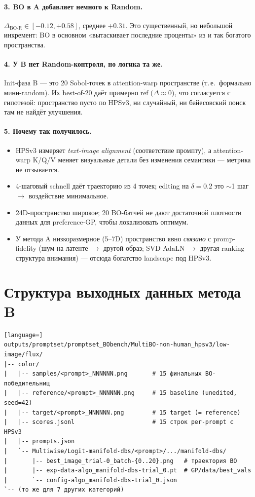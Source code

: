 \documentclass[11pt,a4paper]{article}
\begin{document}
\paragraph{3. BO в A добавляет немного к Random.}
$\Delta_\text{BO-R} \in [-0.12, +0.58]$, среднее $+0.31$. Это
существенный, но небольшой инкремент: BO в основном «вытаскивает
последние проценты» из и так богатого пространства.

\paragraph{4. У B нет Random-контроля, но логика та же.}
Init-фаза B --- это 20 Sobol-точек в attention-warp пространстве (т.\,е.\
формально мини-random). Их best-of-20 даёт примерно $\overline{\text{ref}}$
($\Delta \approx 0$), что согласуется с гипотезой: пространство пусто
по HPSv3, ни случайный, ни байесовский поиск там не найдёт улучшения.

\paragraph{5. Почему так получилось.}
\begin{itemize}[leftmargin=2em,itemsep=2pt]
  \item HPSv3 измеряет \emph{text-image alignment} (соответствие промпту),
        а attention-warp K/Q/V меняет визуальные детали без изменения
        семантики --- метрика не отзывается.
  \item 4-шаговый schnell даёт траекторию из 4 точек; editing на
        $\delta=0.2$ это $\sim$1 шаг $\to$ воздействие минимальное.
  \item 24D-пространство широкое; 20 BO-батчей не дают достаточной
        плотности данных для preference-GP, чтобы локализовать оптимум.
  \item У метода A низкоразмерное (5--7D) пространство явно \emph{связано}
        с promp-fidelity (шум на латенте $\to$ другой образ; SVD-AdaLN
        $\to$ другая ranking-структура внимания) --- отсюда богатство
        landscape под HPSv3.
\end{itemize}

\section{Структура выходных данных метода B}

\begin{lstlisting}[language=]
outputs/promptset/promptset_BObench/MultiBO-non-human_hpsv3/low-image/flux/
|-- color/
|   |-- samples/<prompt>_NNNNNN.png       # 15 финальных BO-победительниц
|   |-- reference/<prompt>_NNNNNN.png     # 15 baseline (unedited, seed=42)
|   |-- target/<prompt>_NNNNNN.png        # 15 target (= reference)
|   |-- scores.jsonl                      # 15 строк per-prompt с HPSv3
|   |-- prompts.json
|   `-- Multiwise/Logit-manifold-dbs/<prompt>/.../manifold-dbs/
|       |-- best_image_trial-0_batch-{0..20}.png   # траектория BO
|       |-- exp-data-algo_manifold-dbs-trial_0.pt  # GP/data/best_vals
|       `-- config-algo_manifold-dbs-trial_0.json
`-- (то же для 7 других категорий)
\end{lstlisting}
\end{document}

